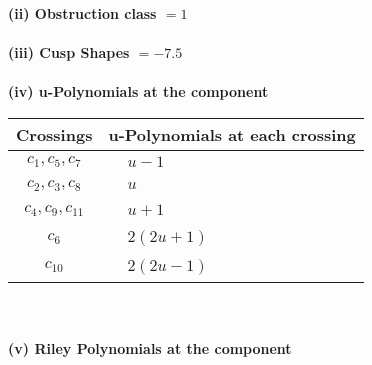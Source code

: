 \documentclass[1p]{elsarticle_modified}
\theoremstyle{definition}
\begin{document}
\flushleft \textbf{(ii) Obstruction class $= 1$}\\~\\
\flushleft \textbf{(iii) Cusp Shapes $= -7.5$}\\~\\
\newpage\renewcommand{\arraystretch}{1}
\flushleft \textbf{(iv) u-Polynomials at the component}\newline \\
\begin{tabular}{m{50pt}|m{274pt}}
Crossings & \hspace{64pt}u-Polynomials at each crossing \\
\hline $$\begin{aligned}c_{1},c_{5},c_{7}\end{aligned}$$&$\begin{aligned}
&u-1
\end{aligned}$\\
\hline $$\begin{aligned}c_{2},c_{3},c_{8}\end{aligned}$$&$\begin{aligned}
&u
\end{aligned}$\\
\hline $$\begin{aligned}c_{4},c_{9},c_{11}\end{aligned}$$&$\begin{aligned}
&u+1
\end{aligned}$\\
\hline $$\begin{aligned}c_{6}\end{aligned}$$&$\begin{aligned}
&2(2 u+1)
\end{aligned}$\\
\hline $$\begin{aligned}c_{10}\end{aligned}$$&$\begin{aligned}
&2(2 u-1)
\end{aligned}$\\
\hline
\end{tabular}\\~\\
\newpage\renewcommand{\arraystretch}{1}
\flushleft \textbf{(v) Riley Polynomials at the component}\newline \\
\end{document}

